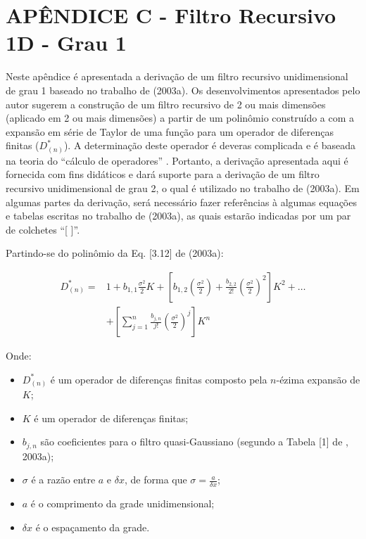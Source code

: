 
\chapter{APÊNDICE C - Filtro Recursivo 1D - Grau 1}
\label{apendiceIV}

Neste apêndice é apresentada a derivação de um filtro recursivo unidimensional de grau 1 baseado no trabalho de  (2003a). Os desenvolvimentos apresentados pelo autor sugerem a construção de um filtro recursivo de 2 ou mais dimensões (aplicado em 2 ou mais dimensões) a partir de um polinômio construído a com a expansão em série de Taylor de uma função para um operador de diferenças finitas ($D^{*}_{(n)}$). A determinação deste operador é deveras complicada e é baseada na teoria do ``cálculo de operadores'' \cite{dahlquistandbjorck/1974}. Portanto, a derivação apresentada aqui é fornecida com fins didáticos e dará suporte para a derivação de um filtro recursivo unidimensional de grau 2, o qual é utilizado no trabalho de  (2003a). Em algumas partes da derivação, será necessário fazer referências à algumas equações e tabelas escritas no trabalho de  (2003a), as quais estarão indicadas por um par de colchetes ``[ ]''.
 
Partindo-se do polinômio da Eq. [3.12] de  (2003a):

\begin{equation}
\label{apIV_eq:1}
  \begin{aligned}
  D^{*}_{(n)} = {} & 1 + b_{1,1} \frac{\sigma^{2}}{2} K + \left[ b_{1,2} \left(\frac{\sigma^{2}}{2}\right) + \frac{b_{2,2}}{2!} \left(\frac{\sigma^{2}}{2}\right)^2 \right] K^{2} + \dots \\
  & + \left[\sum_{j=1}^{n}{\frac{b_{j,n}}{j!} \left(\frac{\sigma^{2}}{2}\right)^{j} }\right] K^{n}
  \end{aligned}
\end{equation}

Onde:

\begin{itemize}
	\item $D^{*}_{(n)}$ é um operador de diferenças finitas composto pela $n$-ézima expansão de $K$;
	\item $K$ é um operador de diferenças finitas;
	\item $b_{j,n}$ são coeficientes para o filtro quasi-Gaussiano (segundo a Tabela [1] de , 2003a);
	\item $\sigma$ é a razão entre $a$ e $\delta{x}$, de forma que $\sigma = \frac{a}{\delta{x}}$;
	\item $a$ é o comprimento da grade unidimensional;
	\item $\delta{x}$ é o espaçamento da grade.
\end{itemize}

